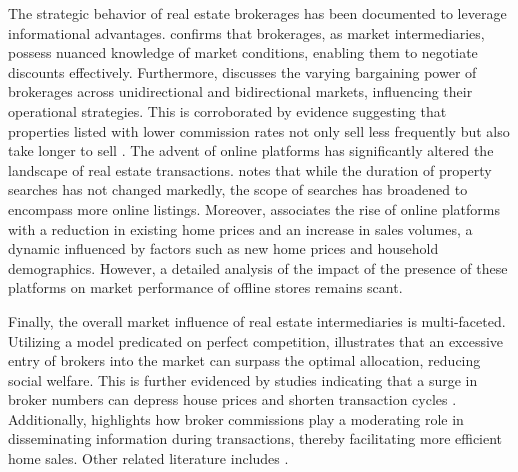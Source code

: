 \documentclass[12pt]{article}
\begin{document}
The strategic behavior of real estate brokerages has been documented to leverage informational advantages. \citet{AGARWAL2019715} confirms that brokerages, as market intermediaries, possess nuanced knowledge of market conditions, enabling them to negotiate discounts effectively. Furthermore, \citet{HAN2015813} discusses the varying bargaining power of brokerages across unidirectional and bidirectional markets, influencing their operational strategies. This is corroborated by evidence suggesting that properties listed with lower commission rates not only sell less frequently but also take longer to sell \citep{10.1257/app.20160214}. The advent of online platforms has significantly altered the landscape of real estate transactions. \citet{ZUMPANO2003134} notes that while the duration of property searches has not changed markedly, the scope of searches has broadened to encompass more online listings. Moreover, \citet{ZHANG2021101104} associates the rise of online platforms with a reduction in existing home prices and an increase in sales volumes, a dynamic influenced by factors such as new home prices and household demographics. However, a detailed analysis of the impact of the presence of these platforms on market performance of offline stores remains scant.

Finally, the overall market influence of real estate intermediaries is multi-faceted. Utilizing a model predicated on perfect competition, \citet{williams_agency_1998} illustrates that an excessive entry of brokers into the market can surpass the optimal allocation, reducing social welfare. This is further evidenced by studies indicating that a surge in broker numbers can depress house prices and shorten transaction cycles \citep{https://doi.org/10.1002/jae.2891}. Additionally, \citet{qu_identifying_2021-1} highlights how broker commissions play a moderating role in disseminating information during transactions, thereby facilitating more efficient home sales. Other related literature includes \citep{doi:10.1080/10527001.2021.2016340, doi:10.1080/10835547.1996.12090852}.

\end{document}
